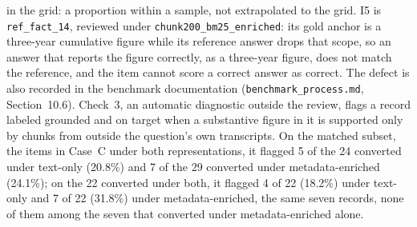 \begin{table}[h!]
{    \thesisQeightAnsweredGroundedOfftarget{} in the grid: a proportion within
    a sample, not extrapolated to the grid. I5 is \texttt{ref\_fact\_14},
    reviewed under \texttt{chunk200\_bm25\_enriched}: its gold anchor is a three-year cumulative figure while its reference answer drops that scope, so an answer that reports the figure correctly, as a three-year figure, does not match the reference, and the item cannot score a correct answer as correct.
    The defect is also recorded in the benchmark documentation (\texttt{benchmark\_process.md}, Section~10.6).
    Check~3, an automatic diagnostic outside the review, flags a record labeled
    grounded and on target when a substantive figure in it is supported only by
    chunks from outside the question's own transcripts. On the matched subset,
    the items in Case~C under both representations, it flagged 5 of the 24
    converted under text-only (20.8\%) and 7 of the 29 converted under
    metadata-enriched (24.1\%); on the 22 converted under both, it flagged 4 of
    22 (18.2\%) under text-only and 7 of 22 (31.8\%) under metadata-enriched,
    the same seven records, none of them among the seven that converted under
    metadata-enriched alone.}
\end{table}

\newpage

